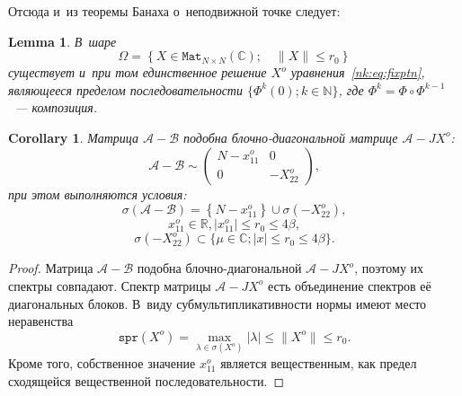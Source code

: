 \documentclass[14pt,a4paper]{extarticle}
\newtheorem{lem}{Lemma}
\newtheorem{crl}{Corollary}
\theoremstyle{definition}
\begin{document}
Отсюда и~из теоремы Банаха о~неподвижной точке следует:
\begin{lem}
В~шаре \[ \Omega = \left\{ X\in\mathtt{Mat}_{N{\times}N}(\mathbb{C}); \quad \|X\| \leq r_0 \right\} \]
    существует и~при том единственное решение \( X^o \) уравнения~\eqref{nk:eq:fixptn},
    являющееся пределом последовательности \( \{ \Phi^k(0); k\in\mathbb{N} \} \),
    где \( \Phi^k = \Phi\circ\Phi^{k-1} \)~--- композиция.
\end{lem}

\begin{crl}
Матрица \( \mathcal{A} - \mathcal{B} \) подобна блочно-диагональной матрице \( \mathcal{A} - J X^o \):
\[ \mathcal{A} - \mathcal{B} \sim
\begin{pmatrix}
N - x_{11}^o & 0 \\
0 & -X_{22}^o
\end{pmatrix}, \]
при этом выполняются условия:
\[ \sigma\left(\mathcal{A} - \mathcal{B}\right) = \left\{N-x_{11}^o\right\}\cup \sigma\left(-X_{22}^o\right), \]
    \[ x_{11}^o\in\mathbb{R}, \lvert x_{11}^o \rvert \leq r_0 \leq 4\beta, \]
\[ \sigma\left(-X_{22}^o\right) \subset \{ \mu\in\mathbb{C}; \lvert x \rvert \leq r_0 \leq 4\beta \}. \]
\end{crl}
\begin{proof}
    Матрица \( \mathcal{A} - \mathcal{B} \) подобна блочно-диагональной \( \mathcal{A} - J X^o \),
    поэтому их спектры совпадают.
    Спектр матрицы \( \mathcal{A} - J X^o \) есть объединение спектров е\"е диагональных блоков.
    В~виду субмультипликативности нормы имеют место неравенства
    \[ \mathtt{spr}(X^o) = \max_{\lambda\in\sigma(X^o)}\lvert\lambda\rvert \leq \|X^o\| \leq r_0. \]
    Кроме того, собственное значение \( x_{11}^o \) является вещественным, как предел сходящейся вещественной последовательности.
\end{proof}
\end{document}
